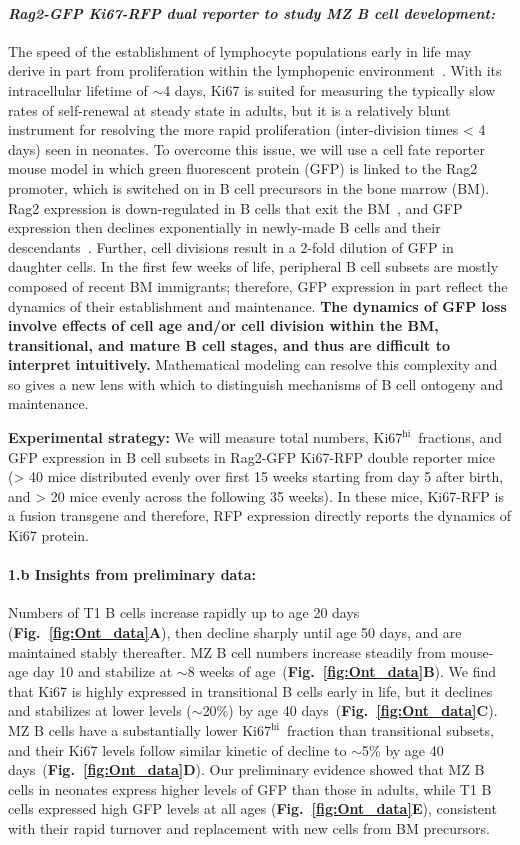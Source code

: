 \documentclass[11pt]{article}
\newcommand{\khi}{\ensuremath{\text{Ki67}^\text{hi}}~}
\newcommand{\para}[1]{\vspace*{-4.5mm}\paragraph{#1}}
\begin{document}
\para{\textit{Rag2-GFP Ki67-RFP dual reporter to study MZ B cell development:}}
The speed of the establishment of lymphocyte populations early in life may derive in part from proliferation within the lymphopenic environment~\cite{Min_2003}.
With its intracellular lifetime of $\sim$4 days,  Ki67 is suited for measuring the typically slow rates of self-renewal at steady state in adults, but it is a relatively blunt instrument for resolving the more rapid proliferation (inter-division times < 4 days) seen in neonates. 
To overcome this issue, we will use a cell fate reporter mouse model in which green fluorescent protein (GFP) is linked to the Rag2 promoter, which is switched on in B cell precursors in the bone marrow (BM).
Rag2 expression is down-regulated in B cells that exit the BM~\cite{Grawunder_1995}, and GFP expression then declines exponentially in newly-made B cells and  their descendants~\cite{Yu_1999, Monroe_1999}. 
Further, cell divisions result in a 2-fold dilution of GFP in daughter cells. 
In the first few weeks of life, peripheral B cell subsets are mostly composed of recent BM immigrants; therefore, GFP expression in part reflect the dynamics of their establishment and maintenance. 
\textbf{The dynamics of GFP loss involve effects of cell age and/or cell division within the BM, transitional, and mature B cell stages, and thus are difficult to interpret intuitively.}
Mathematical modeling can resolve this complexity and so gives a new lens with which to distinguish mechanisms of B cell ontogeny and maintenance. 

\textbf{Experimental strategy:} 
We will measure total numbers,  \khi fractions, and GFP expression in B cell subsets in Rag2-GFP Ki67-RFP double reporter mice (> 40 mice distributed evenly over first 15 weeks starting from day 5 after birth, and > 20 mice evenly across the following 35 weeks). 
In these mice, Ki67-RFP is a fusion transgene and therefore, RFP expression directly reports the dynamics of Ki67 protein.

\para{{1.b Insights from preliminary data:}}
Numbers of T1 B cells increase rapidly up to age 20 days (\textbf{Fig.~\ref{fig:Ont_data}A}), then decline sharply until age 50 days, and are maintained stably thereafter.
MZ B cell numbers increase steadily from mouse-age day 10 and stabilize at  $\sim$8 weeks of age~(\textbf{Fig.~\ref{fig:Ont_data}B}).
We find that Ki67 is highly expressed in transitional B cells early in life, but it declines and stabilizes at lower levels ($\sim$20\%) by age 40 days~(\textbf{Fig.~\ref{fig:Ont_data}C}).
MZ B cells have a substantially lower \khi fraction than transitional subsets, and their Ki67 levels follow similar kinetic of decline to $\sim$5\% by age 40 days~(\textbf{Fig.~\ref{fig:Ont_data}D}).
Our preliminary evidence showed that MZ B cells in neonates express higher levels of GFP than those in adults, while T1 B cells expressed high GFP levels at all ages (\textbf{Fig.~\ref{fig:Ont_data}E}), consistent with their rapid turnover and replacement with new cells from BM precursors.
\end{document}
